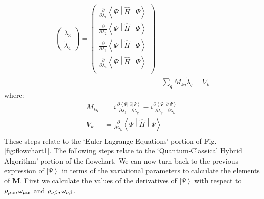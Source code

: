 \documentclass{aux/ttuthes2007}
\newcommand{\bra}[1]{\ensuremath{\left\langle#1\right\vert}}
\newcommand{\ket}[1]{\ensuremath{\left|#1\right\rangle}}
\newcommand{\sandwich}[3]{\left< #1 \middle\vert #2 \middle\vert #3 \right>}
\newcommand{\pd}[1]{\frac{\partial}{\partial #1}}
\newcommand{\kpp}[1]{\frac{\partial \ket\Psi}{\partial #1}}
\newcommand{\bpp}[1]{\frac{\partial \bra\Psi}{\partial #1}}
\newcommand{\ind}[1]{{\uo #1 \oo #1}}
\newcommand{\uo}[1]{
		\IfEqCase{#1}{
			{0}{\mu}
			{1}{\nu}
			{2}{\xi}
		}[\PackageError{uo}{Undefined option to uo: #1}{}]
}
\newcommand{\oo}[1]{
		\IfEqCase{#1}{
			{0}{\alpha}
			{1}{\beta}
			{2}{\gamma}
		}[\PackageError{unocorb}{Undefined option to unuo: #1}{}]
}
\begin{document}
\begin{equation}
\begin{split}
\begin{pmatrix}
			\dot \lambda_3 \\
			\dot \lambda_4 
		\end{pmatrix} 
		=
		\begin{pmatrix}
			\pd {\lambda_1} \sandwich{\Psi}{\hat H}{\Psi}\\
			\pd {\lambda_2} \sandwich{\Psi}{\hat H}{\Psi}\\
			\pd {\lambda_3} \sandwich{\Psi}{\hat H}{\Psi}\\
			\pd {\lambda_4} \sandwich{\Psi}{\hat H}{\Psi}\\
		\end{pmatrix} 
	\\
		&\sum_q M_{kq} \dot \lambda_q = V_k
	\end{split}
\end{equation}
%
where:
%
\begin{equation*}
	\begin{split}
	M_{kq} 
	&= 
	 	i \bpp{\lambda_k} \kpp{\lambda_q} - i \bpp{\lambda_q} \kpp{\lambda_k} 
	\\
	V_k 
	&= 	\pd{\lambda_k}\sandwich{\Psi}{\hat H}{\Psi} \\
	\end{split}
\end{equation*}
%
These steps relate to the `Euler-Lagrange Equations' portion of Fig. \ref{fig:flowchart1}. The following steps relate to the `Quantum-Classical Hybrid Algorithm' portion of the flowchart.
We can now turn back to the previous expression of $\ket{\Psi}$ in terms of the variational parameters to calculate the elements of $\bm M$. First we calculate the values of the derivatives of $\ket \Psi$ with respect to $\rho_\ind 0 ,\omega_\ind 0$ and $\rho_\ind 1 , \omega_\ind 1$.
%
\end{document}
